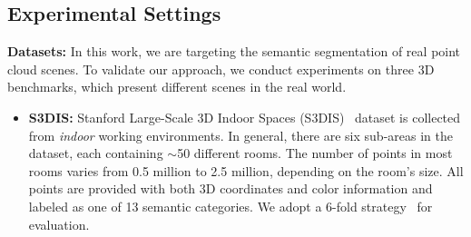 \documentclass[10pt,twocolumn,letterpaper]{article}
\begin{document}
\subsection{Experimental Settings}
\noindent \textbf{Datasets:}
In this work, we are targeting the semantic segmentation of real point cloud scenes. To validate our approach, we conduct experiments on three 3D benchmarks, which present different scenes in the real world. 
\begin{itemize}
 \item \textbf{S3DIS:} 
Stanford Large-Scale 3D Indoor Spaces (S3DIS)~\cite{armeni2017joint} dataset is collected from \emph{indoor} working environments. In general, there are six sub-areas in the dataset, each containing $\sim$50 different rooms. The number of points in most rooms varies from 0.5 million to 2.5 million, depending on the room's size. All points are provided with both 3D coordinates and color information and labeled as one of 13 semantic categories. We adopt a 6-fold strategy~\cite{qi2017pointnet} for evaluation.
\begin{table}
\begin{center}
\captionsetup{font=small, skip=3pt}
\caption{Semantic segmentation (6-fold cross-validation) results (\%) on the \emph{S3DIS} dataset~\cite{armeni2017joint}. (\textbf{mAcc}: average class accuracy, \textbf{OA}: overall accuracy, \textbf{mIoU}: mean Intersection-over-Union. \enquote{-} indicates unknown result.)}
\end{center}
\end{table}
\end{itemize}
\end{document}
